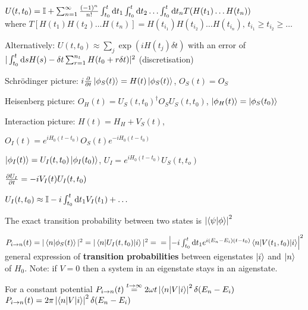 \begin{squishlist}
    \item $U(t,t_0) = \id + \sum_{n=1}^\infty \frac{(-1)^n}{n!} \int_{t_0}^t \ud t_1 \int_{t_0}^t \ud t_2 \ldots \int_{t_0}^t \ud t_n T(H(t_1)\ldots H(t_n))$\\
    where $T[H(t_1)H(t_2)\ldots H(t_n)] = H(t_{i_1})H(t_{i_2})\ldots H(t_{i_n}),\, t_{i_1} \geq t_{i_2} \geq \ldots$
    \item Alternatively: $U(t,t_0) \approx \sum_j \exp(i H(t_j) \delta t)$ with an error of \\
    $|\int_{t_0}^t \ud s H(s) - \delta t \sum_{r=1}^{n_t} H(t_0 + r \delta t)|^2$ (discretisation)
\end{squishlist}

\begin{squishlist}
    \item Schrödinger picture: $i \D{t}{}\ket{\phi_S(t)} = H(t) \ket{\phi_S(t)}$, \quad $O_S(t) = O_S$
    \item Heisenberg picture: $O_H(t) = U_S(t,t_0)^{\dagger} O_S U_S(t,t_0)$, \quad $\ket{\phi_H(t)} = \ket{\phi_S(t_0)}$
    \item Interaction picture: $H(t) = H_H + V_S(t)$, 
    \item $O_I(t) = e^{iH_0(t-t_0)}O_S(t)e^{-iH_0(t-t_0)}$
    \item $\ket{\phi_I(t)} = U_I(t,t_0) \ket{\phi_I(t_0)}$, \quad $U_I = e^{iH_0(t-t_0)} U_S(t,t_o)$
    \item $\D{t}{U_I} = -i V_I(t) U_I(t,t_0)$
\end{squishlist}

\begin{squishlist}
    \item $U_I(t,t_0) \approx \id -i \int_{t_0}^t \ud t_1 V_I(t_1) + \ldots$
    \item The exact transition probability between two states is $\left| \braket{\psi|\phi} \right| ^2$

    \item $P_{i\rightarrow n}(t) = |\braket{n|\phi_S(t)}|^2 = |\braket{n|U_I(t,t_0)|i}|^2 = \\ 
    = \left| -i \int_{t_0}^t \ud t_1 e^{i(E_n-E_i)(t-t_0)} \braket{n|V(t_1,t_0)|i}\right|^2$ general expression of \textbf{transition probabilities} between eigenstates $\ket{i}$ and $\ket{n}$ of $H_0$. Note: if $V=0$ then a system in an eigenstate stays in an aigenstate.
    
    \item For a constant potential $P_{i\rightarrow n}(t) \overset{t\rightarrow \infty}{=} 2 \omega t \left|\braket{n|V|i}\right|^2 \delta(E_n - E_i)$ \\
    $P_{i\rightarrow n}(t) =2 \pi \left|\braket{n|V|i}\right|^2 \delta(E_n - E_i)$
\end{squishlist}

